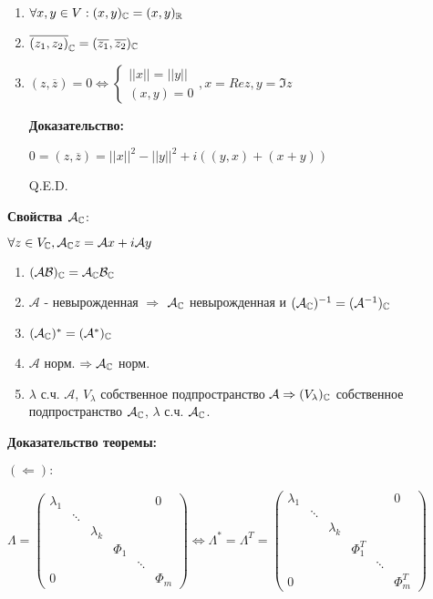 \begin{enumerate}
    \item $\forall x,y \in V: (x,y)_{\mathbb{C}} = (x,y)_{\mathbb{R}}$
    \item $\overline{(z_1,z_2)}_{\mathbb{C}} = (\overline{z_1},\overline{z_2})_{\mathbb{C}}$
    \item $(z,\overline{z}) = 0 \Leftrightarrow \begin{cases}
        ||x|| =||y|| \\
        (x,y) = 0
    \end{cases}, x = Re z, y = \Im z$

    \textbf{Доказательство:}

    $0 = (z,\overline{z})= ||x||^2 -||y||^2 + i((y,x) + (x+y))$

    \hfill Q.E.D.
\end{enumerate}




\textbf{Свойства $\mathcal{A}_{\mathbb{C}}$}:

$\forall z \in V_{\mathbb{C}}, \mathcal{A}_{\mathbb{C}} z=\mathcal{A}x + i \mathcal{A}y$

\begin{enumerate}
    \item $(\mathcal{A}\mathcal{B})_{\mathbb{C}} = \mathcal{A}_{\mathbb{C}} \mathcal{B}_{\mathbb{C}}$
    \item $\mathcal{A}$ -  невырожденная $\Rightarrow$ $\mathcal{A}_{\mathbb{C}}$ невырожденная и $(\mathcal{A}_{\mathbb{C}})^{-1} = (\mathcal{A}^{-1})_{\mathbb{C}}$
    \item $(\mathcal{A}_{\mathbb{C}})^* = (\mathcal{A}^*)_{\mathbb{C}}$

    \item $\mathcal{A}$ норм. $\Rightarrow \mathcal{A}_{\mathbb{C}}$ норм.
    \item $\lambda$ с.ч. $\mathcal{A}$, $V_{\lambda}$ собственное подпространство $\mathcal{A} \Rightarrow (V_{\lambda})_{\mathbb{C}}$ собственное подпространство $\mathcal{A}_{\mathbb{C}}$, $\lambda$ с.ч. $\mathcal{A}_{\mathbb{C}}$. 
\end{enumerate}

\textbf{Доказательство теоремы:}

 $(\Leftarrow):$

$\Lambda = \begin{pmatrix}
    \lambda_1 & & & & &0\\
    & \ddots & & & &\\
    & & \lambda_k & & &\\
    & & & \Phi_1 & &\\
    & & & & \ddots & \\
    0& & & & & \Phi_m
\end{pmatrix} \Leftrightarrow\Lambda^* = \Lambda^T = \begin{pmatrix}
    \lambda_1 & & & & &0\\
    & \ddots & & & &\\
    & & \lambda_k & & &\\
    & & & \Phi_1^T & &\\
    & & & & \ddots & \\
    0& & & & & \Phi_m^T
\end{pmatrix}$ 


